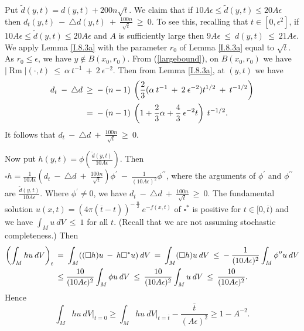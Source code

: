 \documentclass[12pt]{amsart}
\newcommand{\Rm}{\operatorname{Rm}}
\numberwithin{equation}{section}
\theoremstyle{plain}
\theoremstyle{definition}
\theoremstyle{remark}
\begin{document}
Put $\widetilde{d}(y,t) = d(y, t) + 200 n \sqrt{t}$. We claim that if
$10A \epsilon \le \widetilde{d}(y,t) \le 20A\epsilon$ then
$d_t(y,t) \: - \: \triangle d(y,t) \: + \: \frac{100n}{\sqrt{t}} \: \ge \: 0$.
To see this, recalling that $t \in [0, \epsilon^2]$, 
if $10A \epsilon \le \widetilde{d}(y,t) \le 20A\epsilon$ and $A$ is
sufficiently large then
$9A\epsilon \: \le \: d(y, t) \: \le \: 
21A\epsilon$. We apply
Lemma \ref{I.8.3a} with the parameter $r_0$ of
Lemma \ref{I.8.3a} equal to $\sqrt{t}$. As
$r_0 \le \epsilon$, we have $y \notin B(x_0, r_0)$. 
From (\ref{largebound}), on $B(x_0, r_0)$ we have
$|\Rm|(\cdot,t) \: \le \: \alpha \: t^{-1} \: + \: 2 \: \epsilon^{-2}$.
Then from Lemma \ref{I.8.3a}, at $(y, t)$ we have
\begin{align}
d_t \: - \: \triangle d \: & \ge \: - \: (n-1) \:
\left( \frac23 (\alpha \: t^{-1} \: + \: 2 \: \epsilon^{-2} ) t^{1/2}
\: + \: t^{-1/2} \right) \\
& = \: - \: (n-1) \:
\left( 1 + \frac23 \alpha + \frac43 \: 
\epsilon^{-2} t \right) \: t^{-1/2}. \notag
\end{align}
It follows that
$d_t \: - \: \triangle d \: + \: \frac{100n}{\sqrt{t}} \: \ge \: 0$.

Now put $h(y,t) = \phi \left( \frac{\widetilde{d}(y,t)}{10A\epsilon} \right)$.
Then $\square h = \frac{1}{10A\epsilon} \left( 
d_t \: - \: \triangle d \: + \: \frac{100n}{\sqrt{t}} \right) \phi^\prime \: - \:
\frac{1}{(10A\epsilon)^2} \phi^{\prime \prime}$, where the arguments of
$\phi^\prime$ and $\phi^{\prime \prime}$ are 
$\frac{\widetilde{d}(y,t)}{10A\epsilon}$. Where
$\phi^\prime \neq 0$, 
we have $d_t \: - \: \triangle d \: + \: \frac{100n}{\sqrt{t}} \: \ge \: 0$.
The fundamental solution $u(x,t) = (4\pi(\overline{t}-t))^{- \: \frac{n}{2}} \:
e^{-f(x,t)}$ of $\square^*$ is positive for $t \in [0, \overline{t})$ 
and we have
$\int_M u \: dV \: \le \: 1$ for all $t$.
(Recall that we are not assuming stochastic completeness.)
Then
\begin{align}
\left( \int_M hu \: dV \right)_t \: & = \: \int_M ((\square h) u \: - \: h
\square^* u) \: dV \:  = \: \int_M (\square h) u \: dV \: \le \: - \:
\frac{1}{(10A\epsilon)^2} \int_M \phi^{\prime \prime} u \: dV \\
& \le \frac{10}{(10A\epsilon)^2} \int_M \phi u \: dV \:
 \le \:
\frac{10}{(10A\epsilon)^2} \int_M u \: dV \: \le \: \frac{10}{(10A\epsilon)^2}. \notag
\end{align}
Hence 
\begin{equation} \label{ut}
\int_M hu \: dV \Big|_{t=0} \ge \int_M hu \: dV \Big|_{t=\overline{t}} - 
\frac{\overline{t}}{(A\epsilon)^2} \ge 1 - A^{-2}.
\end{equation}
\end{document}
